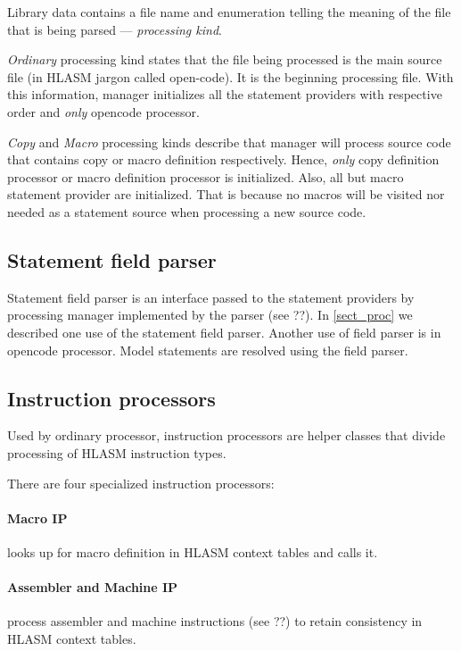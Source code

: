 Library data contains a file name and enumeration telling the meaning of the file that is being parsed --- \emph{processing kind}.

\emph{Ordinary} processing kind states that the file being processed is the main source file (in HLASM jargon called open-code). It is the beginning processing file. With this information, manager initializes all the statement providers with respective order and \emph{only} opencode processor.

\emph{Copy} and \emph{Macro} processing kinds describe that manager will process source code that contains copy or macro definition respectively. Hence, \emph{only} copy  definition processor or macro definition processor is initialized. Also, all but macro statement provider are initialized. That is because no macros will be visited nor needed as a statement source when processing a new source code.


\subsection{Statement field parser}
\label{field_parser}

Statement field parser is an interface passed to the statement providers by processing manager implemented by the parser (see ??).
In \cref{sect_proc} we described one use of the statement field parser.
Another use of field parser is in opencode processor. Model statements are resolved using the field parser.

\subsection{Instruction processors}

Used by ordinary processor, instruction processors are helper classes that divide processing of HLASM instruction types.

There are four specialized instruction processors:
\paragraph*{Macro IP} looks up for macro definition in HLASM context tables and calls it.
\paragraph*{Assembler and Machine IP} process assembler and machine instructions (see ??) to retain consistency in HLASM context tables.

